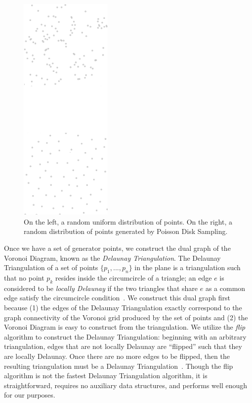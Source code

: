 \documentclass[a4paper,11pt]{report}
\begin{document}
\begin{figure}[htp]
\centering
\includegraphics[width=0.4\textwidth]{gen_pts_v2}
\caption[Random Point Generation]{
	On the left, a random uniform distribution of points. On the right, a random distribution of points generated by Poisson Disk Sampling.
}
\label{fig:pt_gen}
\end{figure}

Once we have a set of generator points, we construct the dual graph of the Voronoi Diagram, known as the \textit{Delaunay Triangulation}. The Delaunay Triangulation of a set of points $\{p_1, ..., p_n\}$ in the plane is a triangulation such that no point $p_k$ resides inside the circumcircle of a triangle; an edge $e$ is considered to be \textit{locally Delaunay} if the two triangles that share $e$ as a common edge satisfy the circumcircle condition~\cite{de11}. We construct this dual graph first because (1) the edges of the Delaunay Triangulation exactly correspond to the graph connectivity of the Voronoi grid produced by the set of points and (2) the Voronoi Diagram is easy to construct from the triangulation. We utilize the \textit{flip} algorithm to construct the Delaunay Triangulation: beginning with an arbitrary triangulation, edges that are not locally Delaunay are ``flipped'' such that they are locally Delaunay. Once there are no more edges to be flipped, then the resulting triangulation must be a Delaunay Triangulation~\cite{ed08}. Though the flip algorithm is not the fastest Delaunay Triangulation algorithm, it is straightforward, requires no auxiliary data structures, and performs well enough for our purposes.
\end{document}
